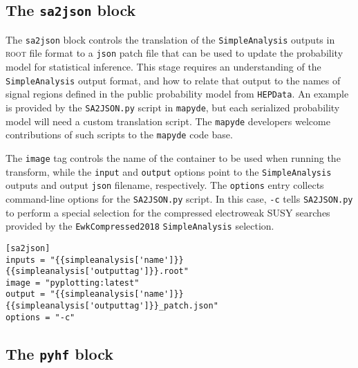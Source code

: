 \documentclass{article}
\newcommand{\mapyde}{\texttt{mapyde}}
\newcommand{\simpleanalysis}{\texttt{SimpleAnalysis}}
\newcommand{\hepdata}{\texttt{HEPData}}
\newcommand{\ROOT}{\textsc{root}}
\newcommand{\json}{\texttt{json}}
\newcommand{\toml}{\textsc{toml}}
\begin{document}
\subsection{The \texttt{sa2json} block}
\label{ssec:the-sa2json-block}

The \texttt{sa2json} block controls the translation of the \simpleanalysis{} outputs in \ROOT{} file format to a \json{} patch file that can be used to update the probability model for statistical inference.  This stage requires an understanding of the \simpleanalysis{} output format, and how to relate that output to the names of signal regions defined in the public probability model from \hepdata.  An example is provided by the \texttt{SA2JSON.py} script in \mapyde, but each serialized probability model will need a custom translation script.  The \mapyde{} developers welcome contributions of such scripts to the \mapyde{} code base.

The \texttt{image} tag controls the name of the container to be used when running the transform, while the \texttt{input} and \texttt{output} options point to the \simpleanalysis{} outputs and output \json{} filename, respectively.  The \texttt{options} entry collects command-line options for the \texttt{SA2JSON.py} script.  In this case, \texttt{-c} tells \texttt{SA2JSON.py} to perform a special selection for the compressed electroweak SUSY searches provided by the \texttt{EwkCompressed2018} \simpleanalysis{} selection.

\begin{listing}[H]
	\begin{verbatim}
[sa2json]
inputs = "{{simpleanalysis['name']}}{{simpleanalysis['outputtag']}}.root"
image = "pyplotting:latest"
output = "{{simpleanalysis['name']}}{{simpleanalysis['outputtag']}}_patch.json"
options = "-c"
        \end{verbatim}
	\caption{The \texttt{sa2json} block of an example \toml{} configuration file for generating slepton events.}
	\label{slepton-config-sa2json}
\end{listing}

\subsection{The \texttt{pyhf} block}
\label{ssec:the-pyhf-block}
\end{document}
